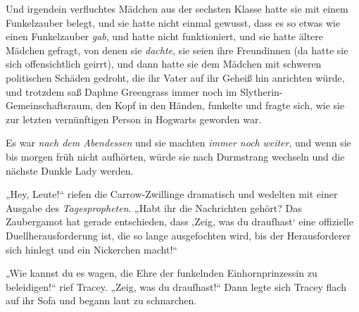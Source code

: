 Und irgendein verfluchtes Mädchen aus der sechsten Klasse hatte sie mit einem Funkelzauber belegt, und sie hatte nicht einmal gewusst, dass es so etwas wie einen Funkelzauber \emph{gab}, und  hatte nicht funktioniert, und sie hatte ältere Mädchen gefragt, von denen sie \emph{dachte}, sie seien ihre Freundinnen (da hatte sie sich offensichtlich geirrt), und dann hatte sie dem Mädchen mit schweren politischen Schäden gedroht, die ihr Vater auf ihr Geheiß hin anrichten würde, und trotzdem saß Daphne Greengrass immer noch im Slytherin-Gemeinschaftsraum, den Kopf in den Händen, funkelte und fragte sich, wie sie zur letzten vernünftigen Person in Hogwarts geworden war.

Es war \emph{nach dem Abendessen} und sie machten \emph{immer noch} \emph{weiter}, und wenn sie bis morgen früh nicht aufhörten, würde sie nach Durmstrang wechseln und die nächste Dunkle Lady werden.

„Hey, Leute!“ riefen die Carrow-Zwillinge dramatisch und wedelten mit einer Ausgabe des \emph{Tagespropheten}.
„Habt ihr die Nachrichten gehört? Das Zaubergamot hat gerade entschieden, dass ‚Zeig, was du draufhast‘ eine offizielle Duellherausforderung ist, die so lange ausgefochten wird, bis der Herausforderer sich hinlegt und ein Nickerchen macht!“

„Wie kannst du es wagen, die Ehre der funkelnden Einhornprinzessin zu beleidigen!“ rief Tracey.
„Zeig, was du draufhast!“ Dann legte sich Tracey flach auf ihr Sofa und begann laut zu schnarchen.

